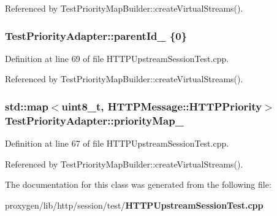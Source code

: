Referenced by Test\+Priority\+Map\+Builder\+::create\+Virtual\+Streams().

\subsubsection[{parent\+Id\+\_\+}]{ Test\+Priority\+Adapter\+::parent\+Id\+\_\+ \{0\}}\label{classTestPriorityAdapter_ad2a0229e7ed6759955908eafe3606f63}


Definition at line 69 of file H\+T\+T\+P\+Upstream\+Session\+Test.\+cpp.



Referenced by Test\+Priority\+Map\+Builder\+::create\+Virtual\+Streams().

\subsubsection[{priority\+Map\+\_\+}]{\setlength{\rightskip}{0pt plus 5cm}std\+::map$<$uint8\+\_\+t, {\bf H\+T\+T\+P\+Message\+::\+H\+T\+T\+P\+Priority}$>$ Test\+Priority\+Adapter\+::priority\+Map\+\_\+}\label{classTestPriorityAdapter_a82e081a34a08cd2d1eda577b2184dc0a}


Definition at line 67 of file H\+T\+T\+P\+Upstream\+Session\+Test.\+cpp.



Referenced by Test\+Priority\+Map\+Builder\+::create\+Virtual\+Streams().



The documentation for this class was generated from the following file\+:\begin{DoxyCompactItemize}
\item 
proxygen/lib/http/session/test/{\bf H\+T\+T\+P\+Upstream\+Session\+Test.\+cpp}\end{DoxyCompactItemize}
